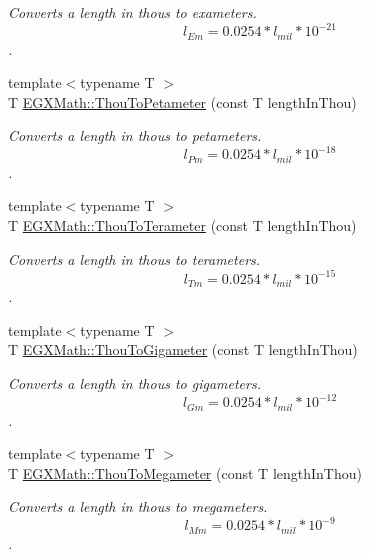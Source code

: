 \begin{DoxyCompactItemize}
\begin{DoxyCompactList}\small\item\em Converts a length in thous to exameters. \[ l_{Em}=0.0254 * l_{mil} * 10^{-21} \]. \end{DoxyCompactList}\item 
{\footnotesize template$<$typename T $>$ }\\T \mbox{\hyperlink{group___e_g_x_math-_conversions-_length_conversions-_imperial-_thou-_s_i_ga14912eb2003dcac47d530dfb90b90761}{E\+G\+X\+Math\+::\+Thou\+To\+Petameter}} (const T length\+In\+Thou)
\begin{DoxyCompactList}\small\item\em Converts a length in thous to petameters. \[ l_{Pm}=0.0254 * l_{mil} * 10^{-18} \]. \end{DoxyCompactList}\item 
{\footnotesize template$<$typename T $>$ }\\T \mbox{\hyperlink{group___e_g_x_math-_conversions-_length_conversions-_imperial-_thou-_s_i_ga166a46a29a2a25eab620f82c43240878}{E\+G\+X\+Math\+::\+Thou\+To\+Terameter}} (const T length\+In\+Thou)
\begin{DoxyCompactList}\small\item\em Converts a length in thous to terameters. \[ l_{Tm}=0.0254 * l_{mil} * 10^{-15} \]. \end{DoxyCompactList}\item 
{\footnotesize template$<$typename T $>$ }\\T \mbox{\hyperlink{group___e_g_x_math-_conversions-_length_conversions-_imperial-_thou-_s_i_ga53354dce1cb2e9b136520fa3cf836305}{E\+G\+X\+Math\+::\+Thou\+To\+Gigameter}} (const T length\+In\+Thou)
\begin{DoxyCompactList}\small\item\em Converts a length in thous to gigameters. \[ l_{Gm}=0.0254 * l_{mil} * 10^{-12} \]. \end{DoxyCompactList}\item 
{\footnotesize template$<$typename T $>$ }\\T \mbox{\hyperlink{group___e_g_x_math-_conversions-_length_conversions-_imperial-_thou-_s_i_ga774f8033626b121ccaf369950df3dd1e}{E\+G\+X\+Math\+::\+Thou\+To\+Megameter}} (const T length\+In\+Thou)
\begin{DoxyCompactList}\small\item\em Converts a length in thous to megameters. \[ l_{Mm}=0.0254 * l_{mil} * 10^{-9} \]. \end{DoxyCompactList}\item 

\end{DoxyCompactItemize}
